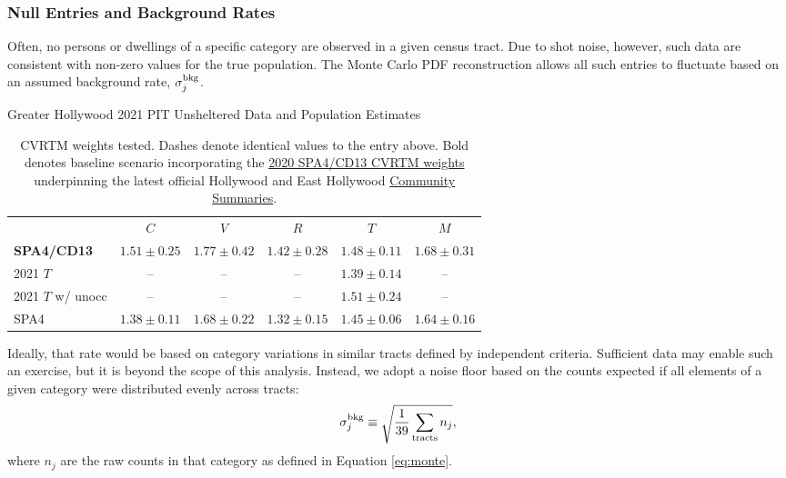 \documentclass[11pt,twocolumn]{article}
\begin{document}
\subsubsection{Null Entries and Background Rates}
\label{sec:nulls}

Often, no persons or dwellings of a specific category are observed in a given census tract. Due to shot 
noise, however, such data are consistent with non-zero values for the true population. The Monte Carlo 
PDF reconstruction allows all such entries to fluctuate based on an assumed background rate,
$\sigma_{j}^{\rm bkg}$. 

\begin{table}[t]
\centering
\caption{Greater Hollywood 2021 PIT Unsheltered Data and Population Estimates}
\begin{tabular}{lccccc}
\toprule
 & $C$ & $V$ & $R$ & $T$ & $M$ \\ \cmidrule{1-6}
{\bf SPA4/CD13} & $1.51\pm0.25$ & $1.77\pm0.42$ & $1.42\pm0.28$ & $1.48\pm0.11$ & $1.68\pm0.31$ \\
2021 $T$ & -- & -- & -- & $1.39\pm0.14$ & --\\
2021 $T$ w/ unocc & -- & -- & --& $1.51\pm0.24$ & --\\
SPA4 & $1.38\pm0.11$ & $1.68\pm0.22$ & $1.32\pm0.15$ & $1.45\pm0.06$ & $1.64\pm0.16$\\
\bottomrule
\end{tabular}
\caption*{CVRTM weights tested. Dashes denote identical values to the entry above. Bold denotes 
baseline scenario incorporating the 
\href{https://www.lahsa.org/documents?id=4635-usc-2018-2020-multipliers-and-estimates-overview}
{2020 SPA4/CD13 CVRTM weights} underpinning the latest official Hollywood and East Hollywood 
\href{https://www.lahsa.org/documents?id=4686-2020-greater-los-angeles-city-community-homelessness-report-service-planning-area-4.pdf}{Community Summaries}.}
\label{tbl:weights}
\end{table}

Ideally, that rate would be based on category variations in similar tracts defined by independent 
criteria. Sufficient data may enable such an exercise, but it is beyond the scope of this analysis. 
Instead, we adopt a noise floor based on the counts expected if all elements of a given category
were distributed evenly across tracts:
\begin{equation}
	\sigma_{j}^{\rm bkg} \equiv \sqrt{\frac{1}{39}\sum_{\rm tracts}n_{j}},
\end{equation}
where $n_{j}$ are the raw counts in that category as defined in Equation \ref{eq:monte}.
\end{document}
